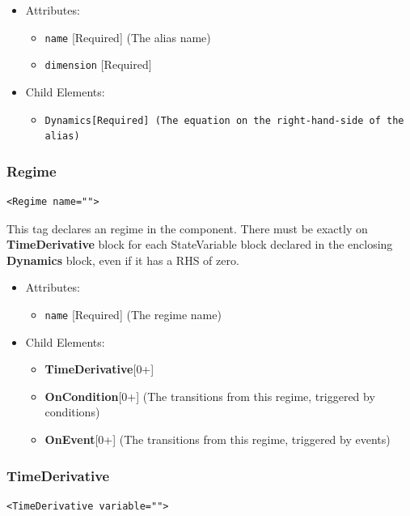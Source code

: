 \documentclass{article}
\newcommand{\Dynamics}{{\bf{Dynamics}}\xspace}
\newcommand{\MathInline}{\tt{Dynamics}}
\newcommand{\TimeDerivative}{{\bf{TimeDerivative}}\xspace}
\newcommand{\OnEvent}{{\bf{OnEvent}}\xspace}
\newcommand{\OnCondition}{{\bf{OnCondition}}\xspace}
\begin{document}
\begin{itemize}
\item Attributes:
\begin{itemize}
\item \verb|name| {[}Required{]} (The alias name)
\item \verb|dimension| {[}Required{]}
\end{itemize}

\item Child Elements:
\begin{itemize}
\item \MathInline {[}Required{]} (The equation on the right-hand-side of the alias)
\end{itemize}
\end{itemize}

\subsubsection{Regime}
%
\begin{lstlisting}
<Regime name="">
\end{lstlisting}

This tag declares an regime in the component. There must be exactly on
\TimeDerivative block for each StateVariable block declared in the
enclosing \Dynamics block, even if it has a RHS of zero.

\begin{itemize}
\item Attributes:
\begin{itemize}
\item \verb|name| {[}Required{]} (The regime name)
\end{itemize}

\item Child Elements:
\begin{itemize}
\item \TimeDerivative {[}0+{]}
\item \OnCondition {[}0+{]} (The transitions from this regime, triggered by conditions)
\item \OnEvent {[}0+{]} (The transitions from this regime, triggered by events)
\end{itemize}

\end{itemize}

\subsubsection{TimeDerivative}
%
\begin{lstlisting}
<TimeDerivative variable="">
\end{lstlisting}
\end{document}
